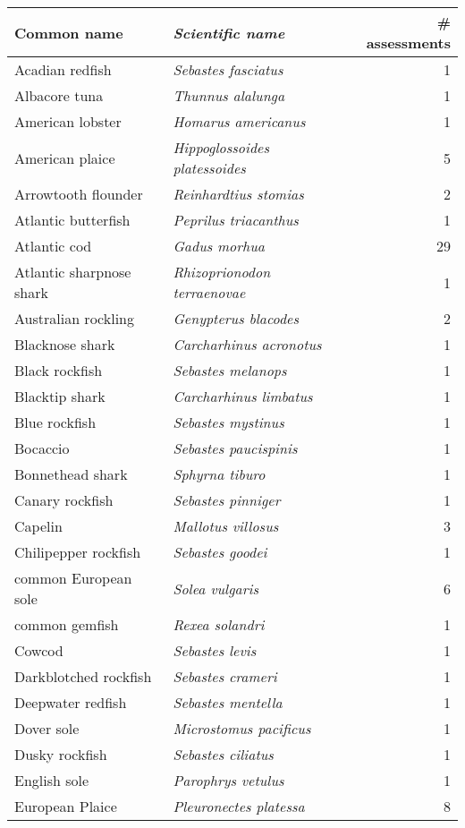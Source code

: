 \begin{tabular}{l | l | r}
Common name & \textit{Scientific name} & \# assessments \\
\hline
Acadian redfish & \textit{Sebastes fasciatus} & 1 \\
Albacore tuna & \textit{Thunnus alalunga} & 1 \\
American lobster & \textit{Homarus americanus} & 1 \\
American plaice & \textit{Hippoglossoides platessoides} & 5 \\
Arrowtooth flounder & \textit{Reinhardtius stomias} & 2 \\
Atlantic butterfish & \textit{Peprilus triacanthus} & 1 \\
Atlantic cod & \textit{Gadus morhua} & 29 \\
Atlantic sharpnose shark & \textit{Rhizoprionodon terraenovae} & 1 \\
Australian rockling & \textit{Genypterus blacodes} & 2 \\
Blacknose shark & \textit{Carcharhinus acronotus} & 1 \\
Black rockfish & \textit{Sebastes melanops} & 1 \\
Blacktip shark & \textit{Carcharhinus limbatus} & 1 \\
Blue rockfish & \textit{Sebastes mystinus} & 1 \\
Bocaccio & \textit{Sebastes paucispinis} & 1 \\
Bonnethead shark & \textit{Sphyrna tiburo} & 1 \\
Canary rockfish & \textit{Sebastes pinniger} & 1 \\
Capelin & \textit{Mallotus villosus} & 3 \\
Chilipepper rockfish & \textit{Sebastes goodei} & 1 \\
common European sole & \textit{Solea vulgaris} & 6 \\
common gemfish & \textit{Rexea solandri} & 1 \\
Cowcod & \textit{Sebastes levis} & 1 \\
Darkblotched rockfish & \textit{Sebastes crameri} & 1 \\
Deepwater redfish & \textit{Sebastes mentella} & 1 \\
Dover sole & \textit{Microstomus pacificus} & 1 \\
Dusky rockfish & \textit{Sebastes ciliatus} & 1 \\
English sole & \textit{Parophrys vetulus} & 1 \\
European Plaice & \textit{Pleuronectes platessa} & 8 \\

\end{tabular}
